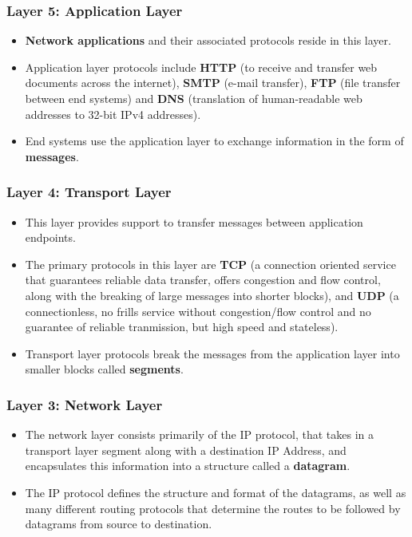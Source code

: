 \documentclass{article}
\theoremstyle{plain}
\theoremstyle{definition}
\begin{document}
\subsubsection{Layer 5: Application Layer}
\begin{itemize}
    \item \textbf{Network applications} and their associated protocols reside in this layer.
    
    \item Application layer protocols include \textbf{HTTP} (to receive and transfer web documents across the internet), \textbf{SMTP} (e-mail transfer), \textbf{FTP} (file transfer between end systems) and \textbf{DNS} (translation of human-readable web addresses to 32-bit IPv4 addresses). 
    
    \item End systems use the application layer to exchange information in the form of \textbf{messages}.
\end{itemize}

\subsubsection{Layer 4: Transport Layer}
\begin{itemize}
    \item This layer provides support to transfer messages between application endpoints. 
    
    \item The primary protocols in this layer are \textbf{TCP} (a connection oriented service that guarantees reliable data transfer, offers congestion and flow control, along with the breaking of large messages into shorter blocks), and \textbf{UDP} (a connectionless, no frills service without congestion/flow control and no guarantee of reliable tranmission, but high speed and stateless).
    
    \item Transport layer protocols break the messages from the application layer into smaller blocks called \textbf{segments}.
\end{itemize}

\subsubsection{Layer 3: Network Layer}
\begin{itemize}
    \item The network layer consists primarily of the IP protocol, that takes in a transport layer segment along with a destination IP Address, and encapsulates this information into a structure called a \textbf{datagram}.
    
    \item The IP protocol defines the structure and format of the datagrams, as well as many different routing protocols that determine the routes to be followed by datagrams from source to destination. 
\end{itemize}
\end{document}
